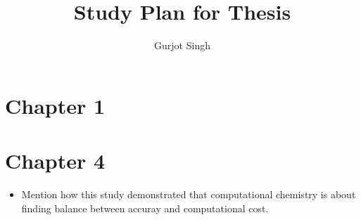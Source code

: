\documentclass{article}
\title{Study Plan for Thesis}
\author{Gurjot Singh}
\begin{document}
\maketitle

\section{Chapter 1}

\section{Chapter 4}

\begin{itemize}
    \item Mention how this study demonstrated that computational chemistry is about finding balance between accuray and computational cost.
\end{itemize}
\end{document}
